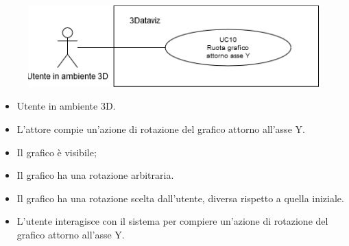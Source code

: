 \begin{figure}[h!]
    \centering
    \includegraphics[scale=0.65]{template/images/UC10.png}
    \caption{}
\end{figure}
\UCdsc
{ %
    \begin{itemize}
        \item Utente in ambiente 3D.
    \end{itemize}
}
{ %
    \begin{itemize}
        \item L'attore compie un'azione di rotazione del grafico attorno all'asse Y.
    \end{itemize}
}
{ %
    \begin{itemize}
        \item Il grafico è visibile;
        \item Il grafico ha una rotazione arbitraria.
    \end{itemize}
}
{ %
    \begin{itemize}
        \item Il grafico ha una rotazione scelta dall'utente, diversa rispetto a quella iniziale.
    \end{itemize}
}
{ %
    \begin{itemize}
        \item L'utente interagisce con il sistema per compiere un'azione di rotazione del grafico attorno all'asse Y.
    \end{itemize}
}

